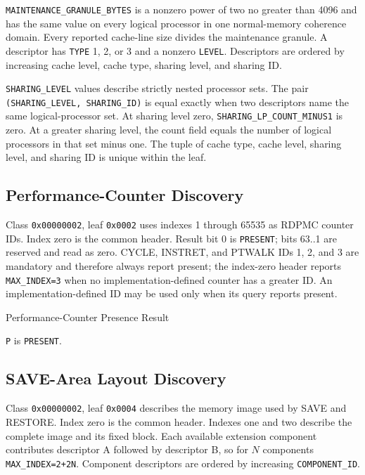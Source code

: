 

\texttt{MAINTENANCE\_GRANULE\_BYTES} is a nonzero power of two no greater than 4096 and has the same value on every
logical processor in one normal-memory coherence domain. Every reported cache-line size divides the maintenance
granule. A descriptor has \texttt{TYPE} 1, 2, or 3 and a nonzero \texttt{LEVEL}. Descriptors are
ordered by increasing cache level, cache type, sharing level, and sharing ID.

\texttt{SHARING\_LEVEL} values describe strictly nested processor sets. The pair
\texttt{(SHARING\_LEVEL, SHARING\_ID)} is equal exactly when two descriptors name the same logical-processor set.
At sharing level zero, \texttt{SHARING\_LP\_COUNT\_MINUS1} is zero. At a greater sharing level, the count field
equals the number of logical processors in that set minus one. The tuple of cache type, cache level, sharing level,
and sharing ID is unique within the leaf.

\subsection{Performance-Counter Discovery}\label{section:performance-counter-discovery}
Class \texttt{0x00000002}, leaf \texttt{0x0002} uses indexes 1 through 65535 as RDPMC counter IDs. Index zero is the
common header. Result bit 0 is \texttt{PRESENT}; bits 63..1 are reserved and read as zero. CYCLE, INSTRET, and PTWALK
IDs 1, 2, and 3 are mandatory and therefore always report present; the index-zero header reports
\texttt{MAX\_INDEX=3} when no implementation-defined counter has a greater ID. An implementation-defined ID may be
used only when its query reports present.

\begin{manuallistedformatdiagram}{Performance-Counter Presence Result}
\end{manuallistedformatdiagram}
{\small\texttt{P} is \texttt{PRESENT}.\par}

\subsection{SAVE-Area Layout Discovery}
Class \texttt{0x00000002}, leaf \texttt{0x0004} describes the memory image used by SAVE and RESTORE. Index zero is
the common header. Indexes one and two describe the complete image and its fixed block. Each available extension
component contributes descriptor A followed by descriptor B, so for $N$ components
\texttt{MAX\_INDEX=2+2N}. Component descriptors are ordered by increasing \texttt{COMPONENT\_ID}.

